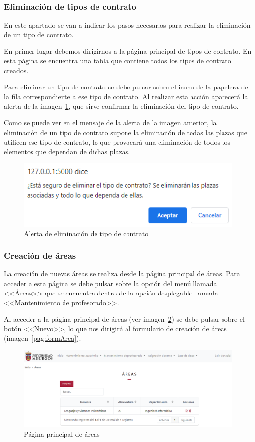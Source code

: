 \subsubsection{Eliminación de tipos de contrato}
En este apartado se van a indicar los pasos necesarios para realizar la eliminación de un tipo de contrato.

En primer lugar debemos dirigirnos a la página principal de tipos de contrato.
En esta página se encuentra una tabla que contiene todos los tipos de contrato creados.

Para eliminar un tipo de contrato se debe pulsar sobre el icono de la papelera de la fila correspondiente a ese tipo de contrato.
Al realizar esta acción aparecerá la alerta de la imagen~\ref{pag:alertElContrato}, que sirve confirmar la eliminación del tipo de contrato.

Como se puede ver en el mensaje de la alerta de la imagen anterior, la eliminación de un tipo de contrato supone la eliminación de todas las plazas que utilicen ese tipo de contrato, lo que provocará una eliminación de todos los elementos que dependan de dichas plazas.

\begin{figure}
	\centering
	\includegraphics[width=.6\textwidth]{../img/Anexos/Manual usuario/alertElContrato.png}
	\caption{Alerta de eliminación de tipo de contrato}\label{pag:alertElContrato}
\end{figure}


\subsubsection{Creación de áreas}
La creación de nuevas áreas se realiza desde la página principal de áreas.
Para acceder a esta página se debe pulsar sobre la opción del menú llamada <<Áreas>> que se encuentra dentro de la opción desplegable llamada <<Mantenimiento de profesorado>>.

Al acceder a la página principal de áreas (ver imagen~\ref{pag:areas}) se debe pulsar sobre el botón <<Nuevo>>, lo que nos dirigirá al formulario de creación de áreas (imagen~\ref{pag:formArea}).

\begin{figure}
	\centering
	\includegraphics[width=\textwidth]{../img/Anexos/Manual usuario/areas.png}
	\caption{Página principal de áreas}\label{pag:areas}
\end{figure}

